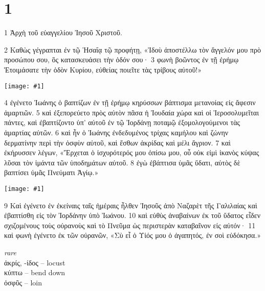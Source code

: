 \documentclass[10pt,a5paper,twoside,twocolumn]{book}
\newcommand{\fig}[1]{\texttt{[image: \#1]}\label{fig:#1}}
\newcommand*\cleartoleftpage{%
  \ifodd\value{page}\hbox{}\clearpage\fi
}
\newenvironment{facing}{\cleartoleftpage}{\clearpage\pagebreak}
\newenvironment{help}{\pagebreak}{}
\newenvironment{helpsec}{\begin{minipage}[t]{\textwidth}\begin{multicols}{2}}{\end{multicols}\end{minipage}}
\newenvironment{vocab}{\begin{helpsec}}{\end{helpsec}}
\begin{document}

\chapter{1}

\begin{facing}

1 Ἀρχὴ τοῦ εὐαγγελίου Ἰησοῦ Χριστοῦ.

2 Καθὼς γέγραπται ἐν τῷ Ἡσαΐᾳ τῷ προφήτῃ,
	«Ἰδοὺ ἀποστέλλω τὸν ἄγγελόν μου πρὸ προσώπου σου, 
	ὃς κατασκευάσει τὴν ὁδόν σου·
		3 φωνὴ βοῶντος ἐν τῇ ἐρήμῳ 
	Ἑτοιμάσατε τὴν ὁδὸν Κυρίου, 
	εὐθείας ποιεῖτε τὰς τρίβους αὐτοῦ!»

\fig{01-04} %

4 ἐγένετο Ἰωάνης ὁ βαπτίζων ἐν τῇ ἐρήμῳ κηρύσσων βάπτισμα μετανοίας εἰς ἄφεσιν ἁμαρτιῶν. 5 καὶ ἐξεπορεύετο πρὸς αὐτὸν πᾶσα ἡ Ἰουδαία χώρα καὶ οἱ Ἱεροσολυμεῖται πάντες, καὶ ἐβαπτίζοντο ὑπ’ αὐτοῦ ἐν τῷ Ἰορδάνῃ ποταμῷ ἐξομολογούμενοι τὰς ἁμαρτίας αὐτῶν. 6 καὶ ἦν ὁ Ἰωάνης ἐνδεδυμένος τρίχας καμήλου καὶ ζώνην δερματίνην περὶ τὴν ὀσφὺν αὐτοῦ, καὶ ἔσθων ἀκρίδας καὶ μέλι ἄγριον. 7 καὶ ἐκήρυσσεν λέγων, «Ἔρχεται ὁ ἰσχυρότερός μου ὀπίσω μου, οὗ οὐκ εἰμὶ ἱκανὸς κύψας λῦσαι τὸν ἱμάντα τῶν ὑποδημάτων αὐτοῦ. 8 ἐγὼ ἐβάπτισα ὑμᾶς ὕδατι, αὐτὸς δὲ βαπτίσει ὑμᾶς Πνεύματι Ἁγίῳ.»

\fig{01-09} %

	9 Καὶ ἐγένετο ἐν ἐκείναις ταῖς ἡμέραις ἦλθεν Ἰησοῦς ἀπὸ Ναζαρὲτ τῆς Γαλιλαίας καὶ ἐβαπτίσθη εἰς τὸν Ἰορδάνην ὑπὸ Ἰωάνου. 10 καὶ εὐθὺς ἀναβαίνων ἐκ τοῦ ὕδατος εἶδεν σχιζομένους τοὺς οὐρανοὺς καὶ τὸ Πνεῦμα ὡς περιστερὰν καταβαῖνον εἰς αὐτόν· 
11 καὶ φωνὴ ἐγένετο ἐκ τῶν οὐρανῶν, «Σὺ εἶ ὁ Υἱός μου ὁ ἀγαπητός, ἐν σοὶ εὐδόκησα.»


\begin{help}

\begin{vocab}

\emph{rare}\\
ἀκρίς, -ίδος -- locust \\
κύπτω -- bend down\\
ὀσφῦς -- loin\\


\end{vocab}
\end{help}
\end{facing}
\end{document}
